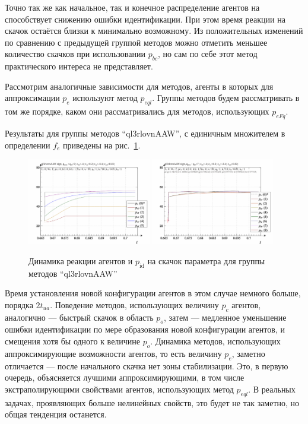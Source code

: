 Точно так же как начальное, так и конечное распределение
агентов на способствует снижению ошибки идентификации.
При этом время реакции на скачок остаётся близки к минимально возможному.
Из положительных изменений по сравнению с предыдущей группой методов
можно отметить меньшее количество скачков при использовании $p_{bc}$,
но сам по себе этот метод практического интереса не представляет.



Рассмотрим аналогичные зависимости для методов, агенты в которых
для аппроксимации $p_e$ используют метод $p_{eql}$.
Группы методов будем рассматривать в том же порядке,
каком они рассматривались для методов, использующих $p_{eFq}$.

Результаты для группы методов ``ql3rlovnAAW'',
с единичным множителем в определении $f_e$
приведены на рис.~\ref{atu:f:ql3rlovnAAW_sign}.

\begin{figure}[htb!]
  \centerline{
    \includegraphics[width=0.48\textwidth]{p/sign/qls-p_t_pi_m_ql3rlovnAAW_sign.png}
    \hfill
    \includegraphics[width=0.48\textwidth]{p/sign/qls-p_t_p_m_ql3rlovnAAW_sign.png}
  }
  \caption{Динамика реакции агентов и $p_\mathrm{id}$ на скачок параметра для группы методов ``ql3rlovnAAW''}
  \label{atu:f:ql3rlovnAAW_sign}
\end{figure}

Время установления новой конфигурации агентов в этом случае немного больше, порядка
$2 t_{ua}$. Поведение методов, использующих величину $p_c$ агентов,
аналогично --- быстрый скачок в область $p_o$, затем --- медленное
уменьшение ошибки идентификации по мере образования новой конфигурации агентов,
и смещения хотя бы одного к величине $p_o$.
Динамика методов, использующих аппроксимирующие возможности агентов,
то есть величину $p_e$, заметно отличается --- после начального скачка
нет зоны стабилизации. Это, в первую очередь, объясняется лучшими аппроксимирующими,
в том числе экстраполирующими свойствами агентов, использующих метод $p_{eql}$.
В реальных задачах, проявляющих больше нелинейных свойств, это будет не так заметно,
но общая тенденция останется.

